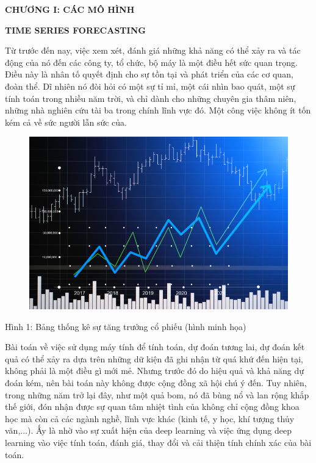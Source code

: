
\newpage
\changefontsizes{16pt}
\centerline{\textbf{CHƯƠNG I: CÁC MÔ HÌNH}}
\centerline{\textbf{TIME SERIES FORECASTING}}

\vspace{1.2cm}
\changefontsizes{13pt}
\setlength{\parindent}{0cm}
Từ trước đến nay, việc xem xét, đánh giá những khả năng có thể xảy ra và tác động của nó đến các công ty, tổ chức, bộ máy là một điều hết sức quan trọng. Điều này là nhân tố quyết định cho sự tồn tại và phát triển của các cơ quan, đoàn thể. Dĩ nhiên nó đòi hỏi có một sự tỉ mỉ, một cái nhìn bao quát, một sự tính toán trong nhiều năm trời, và chỉ dành cho những chuyên gia thâm niên, những nhà nghiên cứu tài ba trong chính lĩnh vực đó. Một công việc không ít tốn kém cả về sức người lẫn sức của.


\begin{center}
	\begin{figure}[htp]
		\begin{center}
			\includegraphics[scale=2.2]{./images/stock.jpg}
		\end{center}
	\end{figure}
\label{fig1}{Hình 1: Bảng thống kê sự tăng trưởng cổ phiếu (hình minh họa)}
\end{center}

Bài toán về việc sử dụng máy tính để tính toán, dự đoán tương lai, dự đoán kết quả có thể xảy ra dựa trên những dữ kiện đã ghi nhận từ quá khứ đến hiện tại, không phải là một điều gì mới mẻ. Nhưng trước đó do hiệu quả và khả năng dự đoán kém, nên bài toán này không được cộng đồng xã hội chú ý đến. Tuy nhiên, trong những năm trở lại đây, như một quả bom, nó đã bùng nổ và lan rộng khắp thế giới, đón nhận được sự quan tâm nhiệt tình của không chỉ cộng đồng khoa học mà còn cả các ngành nghề, lĩnh vực khác (kinh tế, y học, khí tượng thủy văn,...). Ấy là nhờ vào sự xuất hiện của deep learning và việc ứng dụng deep learning vào việc tính toán, đánh giá, thay đổi và cải thiện tính chính xác của bài toán.


